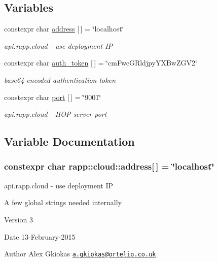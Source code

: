 \subsection*{Variables}
\begin{DoxyCompactItemize}
\item 
constexpr char \hyperlink{namespacerapp_1_1cloud_afb654734a7584ea0243e431aaebd4728}{address} \mbox{[}$\,$\mbox{]} = \char`\"{}localhost\char`\"{}
\begin{DoxyCompactList}\small\item\em api.\-rapp.\-cloud -\/ use deployment I\-P \end{DoxyCompactList}\item 
constexpr char \hyperlink{namespacerapp_1_1cloud_aff8eeba44e8c84efe3401443fb83699a}{auth\-\_\-token} \mbox{[}$\,$\mbox{]} = \char`\"{}cm\-Fwc\-G\-Rldjpy\-Y\-X\-Bw\-Z\-G\-V2\char`\"{}
\begin{DoxyCompactList}\small\item\em base64 encoded authentication token \end{DoxyCompactList}\item 
constexpr char \hyperlink{namespacerapp_1_1cloud_ae0e4cb6fd54bbf45234fc3c21f752b7a}{port} \mbox{[}$\,$\mbox{]} = \char`\"{}9001\char`\"{}
\begin{DoxyCompactList}\small\item\em api.\-rapp.\-cloud -\/ H\-O\-P server port \end{DoxyCompactList}\end{DoxyCompactItemize}


\subsection{Variable Documentation}
\hypertarget{namespacerapp_1_1cloud_afb654734a7584ea0243e431aaebd4728}{
\subsubsection[{address}]{\setlength{\rightskip}{0pt plus 5cm}constexpr char rapp\-::cloud\-::address\mbox{[}$\,$\mbox{]} = \char`\"{}localhost\char`\"{}}}\label{namespacerapp_1_1cloud_afb654734a7584ea0243e431aaebd4728}


api.\-rapp.\-cloud -\/ use deployment I\-P 

A few global strings needed internally \begin{DoxyVersion}{Version}
3 
\end{DoxyVersion}
\begin{DoxyDate}{Date}
13-\/\-February-\/2015 
\end{DoxyDate}
\begin{DoxyAuthor}{Author}
Alex Gkiokas \href{mailto:a.gkiokas@ortelio.co.uk}{\tt a.\-gkiokas@ortelio.\-co.\-uk} 
\end{DoxyAuthor}


